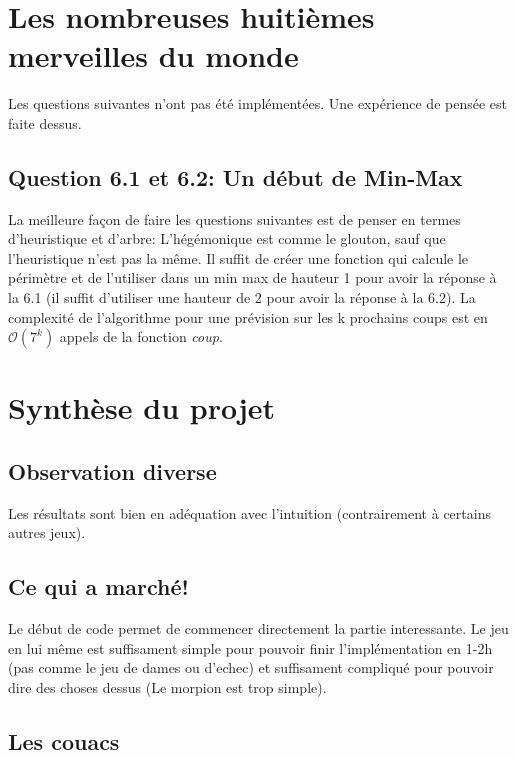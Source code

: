 \documentclass{article}
\begin{document}
    \section{Les nombreuses huitièmes merveilles du monde}

    Les questions suivantes n'ont pas été implémentées. Une expérience de pensée est faite dessus.

    \subsection*{Question 6.1 et 6.2: Un début de Min-Max}

    La meilleure façon de faire les questions suivantes est de penser en termes d'heuristique et d'arbre: L'hégémonique est comme le glouton, sauf que l'heuristique n'est pas la même. Il suffit de créer une fonction qui calcule le périmètre et de l'utiliser dans un min max de hauteur 1 pour avoir la réponse à la 6.1 (il suffit d'utiliser une hauteur de 2 pour avoir la réponse à la 6.2). La complexité de l'algorithme pour une prévision sur les k prochains coups est en $\mathcal{O}(7^k)$ appels de la fonction \textit{coup}. %

    \section*{Synthèse du projet}

    \subsection*{Observation diverse}

    Les résultats sont bien en adéquation avec l'intuition (contrairement à certains autres jeux).

    \subsection*{Ce qui a marché!}

    Le début de code permet de commencer directement la partie interessante. Le jeu en lui même est suffisament simple pour pouvoir finir l'implémentation en 1-2h (pas comme le jeu de dames ou d'echec) et suffisament compliqué pour pouvoir dire des choses dessus (Le morpion est trop simple).

    \subsection*{Les couacs}
\end{document}
